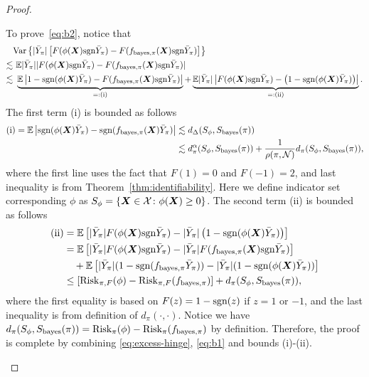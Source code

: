 \documentclass[11pt]{article}
\newcommand*{\KeepStyleUnderBrace}[1]{%
\mathop{%
\mathchoice
{\underbrace{\displaystyle#1}}%
{\underbrace{\textstyle#1}}%
{\underbrace{\scriptstyle#1}}%
{\underbrace{\scriptscriptstyle#1}}%
}\limits
}
\theoremstyle{plain}
\theoremstyle{definition}
\def\sign{\textup{sgn}}
\def\bayesS{S_{\textup{bayes}}}
\def\bayespif{f_{\textup{bayes},\pi}}
\def\risk{\textup{Risk}_\pi}
\def\shift{\bar Y_\pi}
\def\riskF{\textup{Risk}_{\pi,F}}
\begin{document}
\begin{proof}
\begin{enumerate}[label={2.\arabic*},wide, labelwidth=!, labelindent=0pt]
To prove~\eqref{eq:b2}, notice that 
\begin{align}\label{eq:excess-hinge}
&\text{Var}\left\{|\shift|\left[F(\phi(\mX)\sign \shift)-F(\bayespif(\mX)\sign \shift)\right]\right\} \notag \\
\lesssim &\  \mathbb{E}|\shift||F(\phi(\mX)\sign\shift)-F(\bayespif(\mX)\sign \shift)|\notag \\
 \lesssim &\  \KeepStyleUnderBrace{\mathbb{E}\left| 1-\sign(\phi(\mX)\shift)- F(\bayespif(\mX)\sign \shift)\right
|}_{=:\text{(i)}} +\KeepStyleUnderBrace{\mathbb{E}|\shift|\left|F( \phi(\mX)\sign \shift)- \left(1-\sign(\phi(\mX)\shift)\right) \right|}_{=:\text{(ii)}}.
\end{align}
The first term (i) is bounded as follows
\begin{align}
\text{(i)}=\mathbb{E}\left|\sign (\phi(\mX)\shift)-\sign (\bayespif(\mX)\shift)\right|&\lesssim d_\Delta(S_\phi,\bayesS(\pi))\\&\lesssim  d^\alpha_{\pi}(S_\phi,\bayesS(\pi))+{1\over \rho(\pi, \tN)}d_{\pi}(S_\phi,\bayesS(\pi)),
\end{align}
where the first line uses the fact that $F(1)=0$ and $F(-1)=2$, and last inequality is from Theorem~\ref{thm:identifiability}. Here we define indicator set corresponding $\phi$ as $S_\phi = \{\bm X\in\mathcal{X}\colon \phi(\bm X)\geq 0\}$.
The second term (ii) is bounded as follows
\begin{align}
    \text{(ii)}
    &=\mathbb{E}\left[ |\shift| F(\phi(\mX)\sign \shift)- |\shift|\left(1-\sign(\phi(\mX)\shift)\right)\right] \\
    &= \mathbb{E}\left[|\shift|F(\phi(\mX)\sign \shift)-|\shift|F(\bayespif(\mX)\sign \shift)\right]\\
    & \quad + \mathbb{E}\left[|\shift|(1-\sign(\bayespif\shift))-|\shift|(1-\sign(\phi(\mX)\shift))\right]\\
    &\leq [\riskF(\phi)-\riskF(\bayespif)]+d_\pi(S_\phi,\bayesS(\pi)),
\end{align}
where the first equality is based on $F(z) = 1-\sign(z)$ if $z = 1$ or $-1$, and the last inequality is from definition of $d_\pi(\cdot,\cdot)$.  Notice we have  $d_\pi(S_\phi,\bayesS(\pi)) = \risk(\phi)-\risk(\bayespif)$ by definition. Therefore, the proof is complete by combining \eqref{eq:excess-hinge}, \eqref{eq:b1} and bounds (i)-(ii).



\end{enumerate}
\end{proof}
\end{document}
